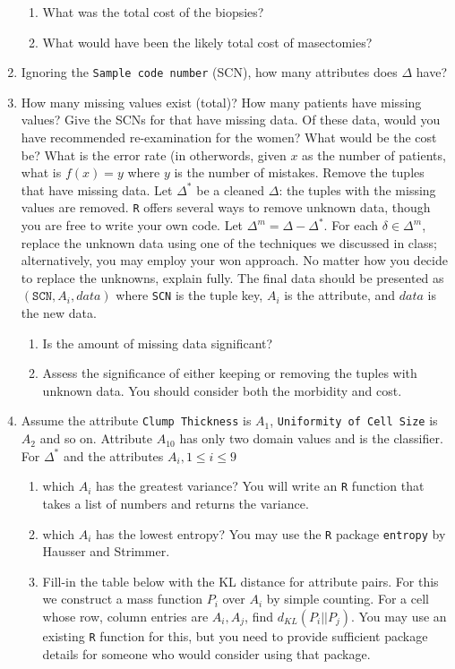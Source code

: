 \documentclass{article}
\begin{document}
\begin{enumerate}
 \begin{enumerate} \item What was the total cost of the biopsies?  \item What would have been the likely total cost of masectomies?  \end{enumerate} \item Ignoring the \texttt{Sample code number} (SCN), how many attributes does $\Delta$ have? \item How many missing values exist (total)? How many patients have missing values? Give the SCNs for that have missing data.  Of these data, would you have recommended re-examination for the women?  What would be the cost be?  What is the error rate (in otherwords, given $x$ as the number of patients, what is $f(x) = y$ where $y$ is the number of mistakes.  Remove the tuples that have missing data.  Let $\Delta^*$ be a cleaned $\Delta$: the tuples with the missing values are removed. \texttt{R} offers several ways to remove unknown data, though you are free to write your own code.  Let $\Delta^m = \Delta - \Delta^*$.  For each $\delta \in\Delta^m$, replace the unknown data using one of the techniques we discussed in class; alternatively, you may employ your won approach.  No matter how you decide to replace the unknowns, explain fully.  The final data should be presented as $(\texttt{SCN}, A_i, data)$ where \texttt{SCN} is the tuple key, $A_i$ is the attribute, and $data$ is the new data. \begin{enumerate} \item Is the amount of missing data significant? \item Assess the significance of either keeping or removing the tuples with unknown data. You should consider both the morbidity and cost.\end{enumerate} \item Assume the attribute \texttt{Clump Thickness} is $A_1$, \texttt{Uniformity of Cell Size} is $A_2$ and so on.  Attribute $A_{10}$ has only two domain values and is the classifier. For $\Delta^*$ and  the attributes $A_i, 1\leq i \leq 9$ \begin{enumerate} \item which $A_i$ has the greatest variance? You will write an {\texttt R} function that takes a list of numbers and returns the variance.  \item which $A_i$ has the lowest entropy? You may use the {\texttt R} package {\texttt {entropy}} by Hausser and Strimmer.  \item Fill-in the table below  with the KL distance for attribute pairs.  For this we construct a mass function $P_i$ over $A_i$ by simple counting.  For a cell whose row, column entries are $A_i, A_j$, find $d_{KL}(P_i||P_j)$.  You may use an existing {\texttt {R}} function for this, but you need to provide sufficient package details for someone who would consider using that package.
 

\end{enumerate}
\end{enumerate}
\end{document}
